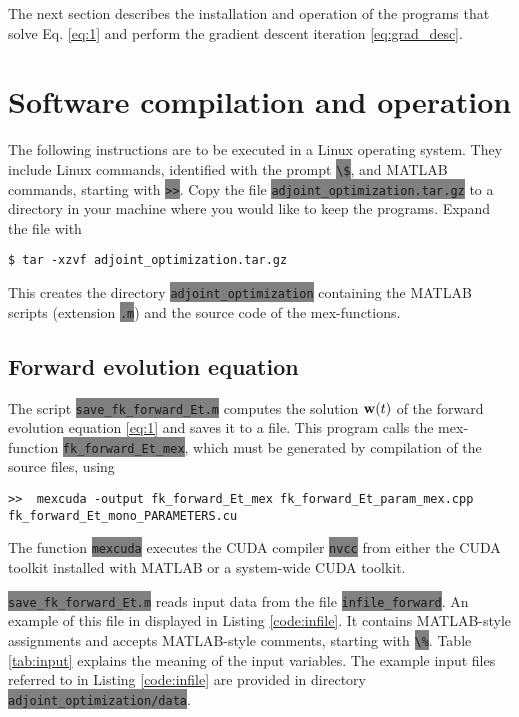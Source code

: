 \documentclass{article}
\newcommand{\code}[1]{\colorbox{gray}{\lstinline|#1|}}
\begin{document}
The next section describes the installation and operation of the programs that solve Eq. \eqref{eq:1} and perform the gradient descent iteration \eqref{eq:grad_desc}.
  

\section{Software compilation and operation}
The following instructions are to be executed in a Linux operating system. They include Linux commands, identified with the prompt \code{\$}, and MATLAB commands, starting with \code{>>}.
Copy the file \code{adjoint_optimization.tar.gz} to a directory in your machine where you would like to keep the programs. Expand the file with
\begin{lstlisting}
$ tar -xzvf adjoint_optimization.tar.gz
\end{lstlisting}
This creates the directory \code{adjoint_optimization} containing the MATLAB scripts (extension \code{.m}) and the source code of the mex-functions.

\subsection{Forward evolution equation}
The script \code{save_fk_forward_Et.m} computes the solution ${\bf w}(t)$ of the forward evolution equation \eqref{eq:1} and saves it to a file. This program calls the mex-function \code{fk_forward_Et_mex},
which must be generated by compilation of the source files, using
\begin{lstlisting}
>>  mexcuda -output fk_forward_Et_mex fk_forward_Et_param_mex.cpp fk_forward_Et_mono_PARAMETERS.cu
\end{lstlisting}
The function \code{mexcuda} executes  the CUDA compiler \code{nvcc} from either the CUDA toolkit installed with MATLAB or a system-wide CUDA toolkit.

\code{save_fk_forward_Et.m} reads input data from the file \code{infile_forward}. An example of this file in displayed in Listing \ref{code:infile}. It contains MATLAB-style assignments and accepts MATLAB-style comments, starting with \code{\%}. Table \ref{tab:input} explains the meaning of the input variables. The example input files referred to in Listing \ref{code:infile} are provided in directory \code{adjoint_optimization/data}.
\end{document}
